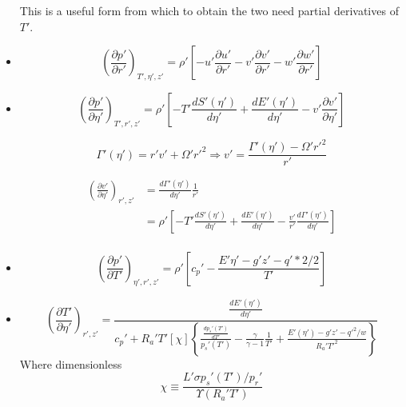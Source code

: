 \documentclass[preprint, prX]{revtex4}
\newcommand{\gogmo}{\frac{\gamma}{\gamma-1}}
\newcommand{\dd}[2]{\frac{d#1}{d#2}}
\newcommand{\pd}[2]{\frac{\partial#1}{\partial#2}}
\newcommand{\tpd}[3]{\left( \frac{\partial#1}{\partial#2} \right)_{#3}}
\begin{document}
\begin{itemize}
This is a useful form from which to obtain the two need partial derivatives of $T'$.

\item 
\begin{equation}
\tpd{p'}{r'}{T', \eta', z'} = \rho' \left[ -u' \pd{u'}{r'} - v'\pd{v'}{r'} - w'\pd{w'}{r'} \right]
\end{equation}

\item
\begin{equation}
\tpd{p'}{\eta'}{T', r', z'} = \rho' \left[ -T' \dd{S'(\eta')}{\eta'} + \dd{E'(\eta')}{\eta'} - v' \pd{v'}{\eta'} \right]
\end{equation}

\begin{equation}
\Gamma'(\eta') = r'v' + \Omega'r'^2 \Rightarrow v' = \frac{\Gamma'(\eta') - \Omega'r'^2}{r'}
\end{equation}

\begin{equation}
\begin{split}
\tpd{v'}{\eta'}{r',z'} &= \dd{\Gamma'(\eta')}{\eta'}\frac{1}{r'} \\
& = \rho' \left[ -T' \dd{S'(\eta')}{\eta'} + \dd{E'(\eta')}{\eta'} - \frac{v'}{r'} \dd{\Gamma'(\eta')}{\eta'} \right] \\
\end{split}
\end{equation}

\item
\begin{equation}
\tpd{p'}{T'}{\eta', r', z'} = \rho' \left[ c_p'- \frac{E'{\eta'} -g'z' - q'*2/2}{T'} \right]
\end{equation}

\item
\begin{equation}
\tpd{T'}{\eta'}{r',z'} = \frac{\dd{E'(\eta')}{\eta'	}}{c_p' + R_a'T'[\chi]\left\{ \frac{\dd{p_s'(T')}{T'}}{p_s'(T')} - \gogmo \frac{1}{T'} + \frac{E'(\eta') - g'z'-q'^2/w}{R_a'T'^2}\right\} }
\end{equation}
Where dimensionless 
\begin{equation}
\chi \equiv \frac{L'\sigma p_s'(T')/p_r'}{\Upsilon(R_a' T')} 
\end{equation}
\end{itemize}
\end{document}
